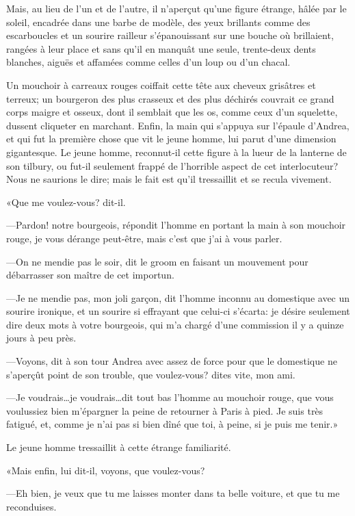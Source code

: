 Mais, au lieu de l'un et de l'autre, il n'aperçut qu'une figure étrange, hâlée par le soleil, encadrée dans une barbe de modèle, des yeux brillants comme des escarboucles et un sourire railleur s'épanouissant sur une bouche où brillaient, rangées à leur place et sans qu'il en manquât une seule, trente-deux dents blanches, aiguës et affamées comme celles d'un loup ou d'un chacal. 

Un mouchoir à carreaux rouges coiffait cette tête aux cheveux grisâtres et terreux; un bourgeron des plus crasseux et des plus déchirés couvrait ce grand corps maigre et osseux, dont il semblait que les os, comme ceux d'un squelette, dussent cliqueter en marchant. Enfin, la main qui s'appuya sur l'épaule d'Andrea, et qui fut la première chose que vit le jeune homme, lui parut d'une dimension gigantesque. Le jeune homme, reconnut-il cette figure à la lueur de la lanterne de son tilbury, ou fut-il seulement frappé de l'horrible aspect de cet interlocuteur? Nous ne saurions le dire; mais le fait est qu'il tressaillit et se recula vivement. 

«Que me voulez-vous? dit-il. 

—Pardon! notre bourgeois, répondit l'homme en portant la main à son mouchoir rouge, je vous dérange peut-être, mais c'est que j'ai à vous parler. 

—On ne mendie pas le soir, dit le groom en faisant un mouvement pour débarrasser son maître de cet importun. 

—Je ne mendie pas, mon joli garçon, dit l'homme inconnu au domestique avec un sourire ironique, et un sourire si effrayant que celui-ci s'écarta: je désire seulement dire deux mots à votre bourgeois, qui m'a chargé d'une commission il y a quinze jours à peu près. 

—Voyons, dit à son tour Andrea avec assez de force pour que le domestique ne s'aperçût point de son trouble, que voulez-vous? dites vite, mon ami. 

—Je voudrais\dots je voudrais\dots dit tout bas l'homme au mouchoir rouge, que vous voulussiez bien m'épargner la peine de retourner à Paris à pied. Je suis très fatigué, et, comme je n'ai pas si bien dîné que toi, à peine, si je puis me tenir.» 

Le jeune homme tressaillit à cette étrange familiarité. 

«Mais enfin, lui dit-il, voyons, que voulez-vous? 

—Eh bien, je veux que tu me laisses monter dans ta belle voiture, et que tu me reconduises. 

